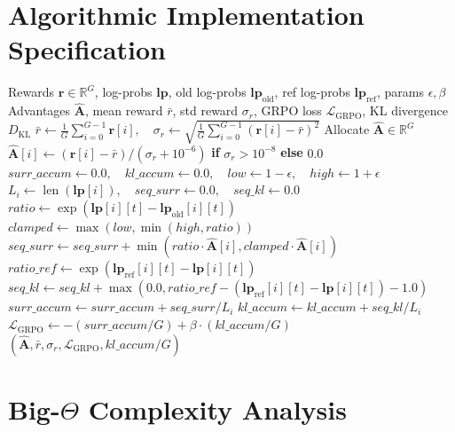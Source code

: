 \documentclass[11pt,a4paper]{article}
\theoremstyle{definition}
\begin{document}
\section{Algorithmic Implementation Specification}

\begin{algorithm}[H]
\caption{Group Relative Policy Optimization (GRPO) Evaluation}
\begin{algorithmic}[1]
\Require Rewards $\mathbf{r} \in \mathbb{R}^G$, log-probs $\mathbf{lp}$, old log-probs $\mathbf{lp}_{\text{old}}$, ref log-probs $\mathbf{lp}_{\text{ref}}$, params $\epsilon, \beta$
\Ensure Advantages $\hat{\mathbf{A}}$, mean reward $\bar{r}$, std reward $\sigma_r$, GRPO loss $\mathcal{L}_{\text{GRPO}}$, KL divergence $D_{\text{KL}}$
\State $\bar{r} \gets \frac{1}{G}\sum_{i=0}^{G-1} \mathbf{r}[i], \quad \sigma_r \gets \sqrt{\frac{1}{G}\sum_{i=0}^{G-1} (\mathbf{r}[i] - \bar{r})^2}$
\State Allocate $\hat{\mathbf{A}} \in \mathbb{R}^G$
    \State $\hat{\mathbf{A}}[i] \gets (\mathbf{r}[i] - \bar{r}) / (\sigma_r + 10^{-6})$ \textbf{if} $\sigma_r > 10^{-8}$ \textbf{else} $0.0$
\EndFor
\State $surr\_accum \gets 0.0, \quad kl\_accum \gets 0.0, \quad low \gets 1 - \epsilon, \quad high \gets 1 + \epsilon$
    \State $L_i \gets \operatorname{len}(\mathbf{lp}[i]), \quad seq\_surr \gets 0.0, \quad seq\_kl \gets 0.0$
        \State $ratio \gets \exp(\mathbf{lp}[i][t] - \mathbf{lp}_{\text{old}}[i][t])$
        \State $clamped \gets \max(low, \min(high, ratio))$
        \State $seq\_surr \gets seq\_surr + \min(ratio \cdot \hat{\mathbf{A}}[i], clamped \cdot \hat{\mathbf{A}}[i])$
        \State $ratio\_ref \gets \exp(\mathbf{lp}_{\text{ref}}[i][t] - \mathbf{lp}[i][t])$
        \State $seq\_kl \gets seq\_kl + \max(0.0, ratio\_ref - (\mathbf{lp}_{\text{ref}}[i][t] - \mathbf{lp}[i][t]) - 1.0)$
    \EndFor
    \State $surr\_accum \gets surr\_accum + seq\_surr / L_i$
    \State $kl\_accum \gets kl\_accum + seq\_kl / L_i$
\EndFor
\State $\mathcal{L}_{\text{GRPO}} \gets - (surr\_accum / G) + \beta \cdot (kl\_accum / G)$
\State \Return $(\hat{\mathbf{A}}, \bar{r}, \sigma_r, \mathcal{L}_{\text{GRPO}}, kl\_accum / G)$
\end{algorithmic}
\end{algorithm}

\section{Big-$\Theta$ Complexity Analysis}
\end{document}

